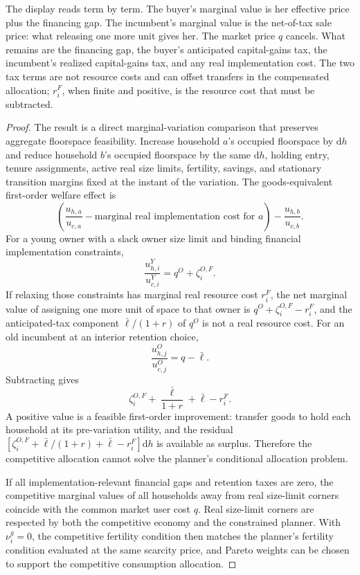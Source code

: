 \documentclass[11pt]{article}
\newcommand{\dd}{\mathrm d}
\newcommand{\1}{\mathbf 1}
\begin{document}
The display reads term by term. The buyer's marginal value is her effective price plus the financing gap. The incumbent's marginal value is the net-of-tax sale price: what releasing one more unit gives her. The market price $q$ cancels. What remains are the financing gap, the buyer's anticipated capital-gains tax, the incumbent's realized capital-gains tax, and any real implementation cost. The two tax terms are not resource costs and can offset transfers in the compensated allocation; $r_i^F$, when finite and positive, is the resource cost that must be subtracted.

\begin{proof}
The result is a direct marginal-variation comparison that preserves aggregate floorspace feasibility. Increase household $a$'s occupied floorspace by $\dd h$ and reduce household $b$'s occupied floorspace by the same $\dd h$, holding entry, tenure assignments, active real size limits, fertility, savings, and stationary transition margins fixed at the instant of the variation. The goods-equivalent first-order welfare effect is
\[
\left(\frac{u_{h,a}}{u_{c,a}}-\text{marginal real implementation cost for }a\right)-\frac{u_{h,b}}{u_{c,b}}.
\]
For a young owner with a slack owner size limit and binding financial implementation constraints,
\[
\frac{u^Y_{h,i}}{u^Y_{c,i}}=q^O+\zeta_i^{O,F}.
\]
If relaxing those constraints has marginal real resource cost $r_i^F$, the net marginal value of assigning one more unit of space to that owner is $q^O+\zeta_i^{O,F}-r_i^F$, and the anticipated-tax component $\bar\ell/(1+r)$ of $q^O$ is not a real resource cost. For an old incumbent at an interior retention choice,
\[
\frac{u^O_{h,j}}{u^O_{c,j}}=q-\bar\ell.
\]
Subtracting gives
\[
\zeta_i^{O,F}+\frac{\bar\ell}{1+r}+\bar\ell-r_i^F.
\]
A positive value is a feasible first-order improvement: transfer goods to hold each household at its pre-variation utility, and the residual $\left[\zeta_i^{O,F}+\bar\ell/(1+r)+\bar\ell-r_i^F\right]\dd h$ is available as surplus. Therefore the competitive allocation cannot solve the planner's conditional allocation problem.

If all implementation-relevant financial gaps and retention taxes are zero, the competitive marginal values of all households away from real size-limit corners coincide with the common market user cost $q$. Real size-limit corners are respected by both the competitive economy and the constrained planner. With $\nu_i^g=0$, the competitive fertility condition then matches the planner's fertility condition evaluated at the same scarcity price, and Pareto weights can be chosen to support the competitive consumption allocation.
\end{proof}
\end{document}
